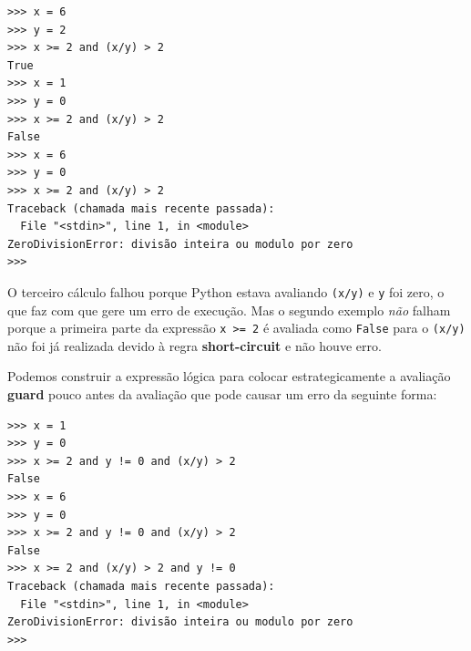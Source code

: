 \beforeverb
\begin{verbatim}
>>> x = 6 
>>> y = 2
>>> x >= 2 and (x/y) > 2
True
>>> x = 1 
>>> y = 0
>>> x >= 2 and (x/y) > 2
False
>>> x = 6
>>> y = 0
>>> x >= 2 and (x/y) > 2
Traceback (chamada mais recente passada):
  File "<stdin>", line 1, in <module>
ZeroDivisionError: divisão inteira ou modulo por zero
>>> 
\end{verbatim}
\afterverb
%
O terceiro cálculo falhou porque Python estava avaliando {\tt (x/y)}
e {\tt y} foi zero, o que faz com que gere um erro de execução. Mas o segundo exemplo
\emph{não} falham porque a primeira parte da expressão {\tt x >= 2} é
avaliada como {\tt False} para o {\tt (x/y)} não foi já realizada
devido à regra {\bf short-circuit} e não houve erro.



Podemos construir a expressão lógica para colocar estrategicamente a avaliação {\bf guard}
pouco antes da avaliação que pode causar um erro da seguinte forma:


\beforeverb
\begin{verbatim}
>>> x = 1
>>> y = 0
>>> x >= 2 and y != 0 and (x/y) > 2
False
>>> x = 6 
>>> y = 0
>>> x >= 2 and y != 0 and (x/y) > 2
False
>>> x >= 2 and (x/y) > 2 and y != 0
Traceback (chamada mais recente passada):
  File "<stdin>", line 1, in <module>
ZeroDivisionError: divisão inteira ou modulo por zero
>>>
\end{verbatim}
\afterverb
%

